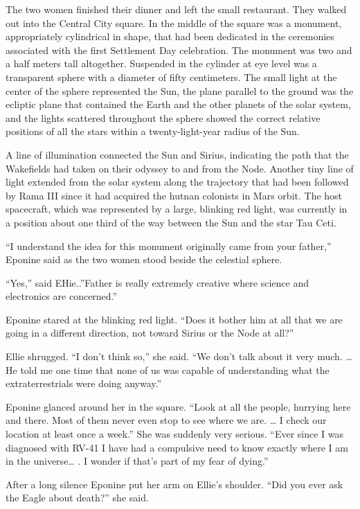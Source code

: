\documentclass[]{article}
\begin{document}
{The two women finished their dinner and left the small restaurant. They walked out into the Central City square. In the middle of the square was a monument, appropriately cylindrical in shape, that had been dedicated in the ceremonies associated with the first Settlement Day celebration. The monument was two and a half meters tall altogether. Suspended in the cylinder at eye level was a transparent sphere with a diameter of fifty centimeters. The small light at the center of the sphere represented the Sun, the plane parallel to the ground was the ecliptic plane that contained the Earth and the other planets of the solar system, and the lights scattered throughout the sphere showed the correct relative positions of all the stars within a twenty-light-year radius of the Sun.

A line of illumination connected the Sun and Sirius, indicating the path that the Wakefields had taken on their odyssey to and from the Node. Another tiny line of light extended from the solar system along the trajectory that had been followed by Rama III since it had acquired the hutnan colonists in Mars orbit. The host spacecraft, which was represented by a large, blinking red light, was currently in a position about one third of the way between the Sun and the star Tau Ceti.

“I understand the idea for this monument originally came from your father,” Eponine said as the two women stood beside the celestial sphere.

“Yes,” said EHie..”Father is really extremely creative where science and electronics are concerned.”

Eponine stared at the blinking red light. “Does it bother him at all that we are going in a different direction, not toward Sirius or the Node at all?”

Ellie shrugged. “I don’t think so,” she said. “We don’t talk about it very much. … He told me one time that none of us was capable of understanding what the extraterrestrials were doing anyway.”

Eponine glanced around her in the square. “Look at all the people, hurrying here and there. Most of them never even stop to see where we are. … I check our location at least once a week.” She was suddenly very serious. “Ever since I was diagnosed with RV-41 I have had a compulsive need to know exactly where I am in the universe… . I wonder if that’s part of my fear of dying.”

After a long silence Eponine put her arm on Ellie’s shoulder. “Did you ever ask the Eagle about death?” she said.

}
\end{document}
